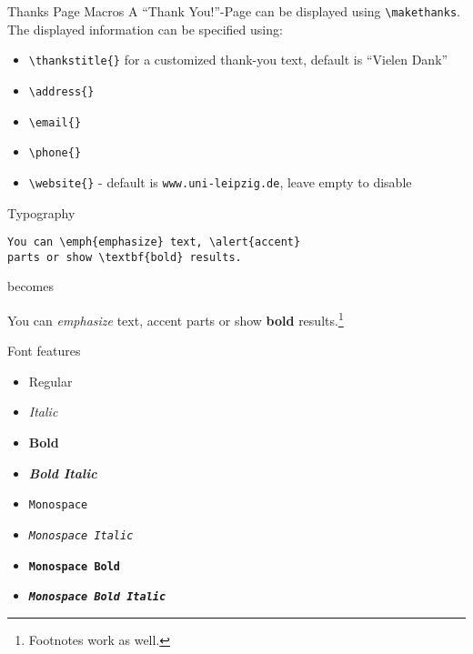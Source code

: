 \documentclass[aspectratio=169]{beamer}
\begin{document}
\begin{frame}[fragile]{Thanks Page Macros}
A ``Thank You!''-Page can be displayed using \verb+\makethanks+. The displayed information can be specified using:
\begin{itemize}
\item \verb+\thankstitle{}+ for a customized thank-you text, default is ``Vielen Dank''
\item \verb+\address{}+ 
\item \verb+\email{}+
\item \verb+\phone{}+
\item \verb+\website{}+ - default is \texttt{www.uni-leipzig.de}, leave empty to disable
\end{itemize}
\end{frame}

\begin{frame}[fragile]{Typography}
\begin{verbatim}
You can \emph{emphasize} text, \alert{accent} 
parts or show \textbf{bold} results.
\end{verbatim}
\begin{center}becomes\end{center}
You can \emph{emphasize} text, \alert{accent} parts or show \textbf{bold} results.\footnote{Footnotes work as well.}
\end{frame}

\begin{frame}{Font features}
  \begin{itemize}
    \item Regular
    \item \textit{Italic}
    \item \textbf{Bold}
    \item \textbf{\textit{Bold Italic}}
    \item \texttt{Monospace}
    \item \texttt{\textit{Monospace Italic}}
    \item \texttt{\textbf{Monospace Bold}}
    \item \texttt{\textbf{\textit{Monospace Bold Italic}}}
  \end{itemize}
\end{frame}
\end{document}
